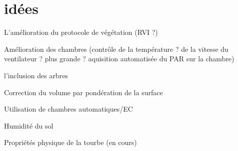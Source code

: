 %
%
%
%


%
%





\section*{idées}

L'amélioration du protocole de végétation (RVI ?)

Amélioration des chambres (contrôle de la température ? de la vitesse du ventilateur ? plus grande ? aquisition automatisée du PAR sur la chambre)

l'inclusion des arbres

Correction du volume par pondération de la surface

Utilisation de chambres automatiques/EC

Humidité du sol

Propriétés physique de la tourbe (en cours)

